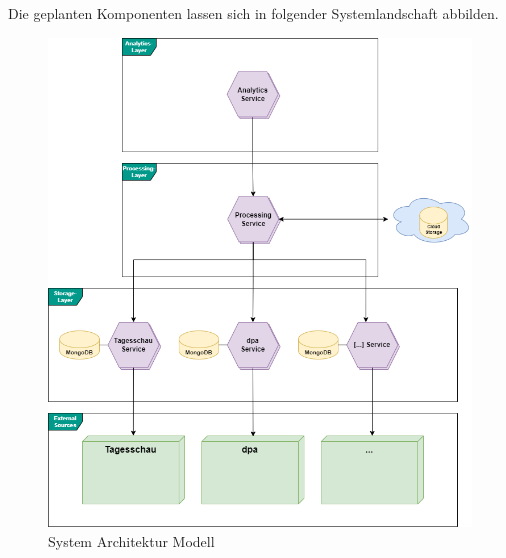 Die geplanten Komponenten lassen sich in folgender Systemlandschaft abbilden.

\begin{figure}
    \centering
    \includegraphics[width=0.5\linewidth]{abbildungen/System Architektur.drawio.png}
    \caption{System Architektur Modell}
    \label{fig:system-architecture}
\end{figure}